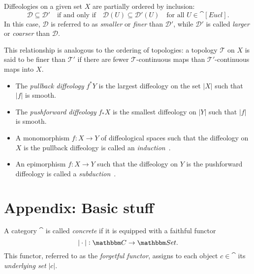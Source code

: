 \documentclass[a4paper,11pt]{article}  %
\newcommand{\Eucl}{\cat[Eucl]}
\begin{document}
\begin{remark}%
Diffeologies on a given set $X$ are partially ordered by inclusion:
$$
\mathcal{D} \subseteq \mathcal{D}' \quad \text{if and only if} \quad \mathcal{D}(U) \subseteq \mathcal{D}'(U) \quad \text{for all } U \in \Eucl.
$$
In this case, \(\mathcal{D}\) is referred to as \emph{smaller} or \emph{finer} than \(\mathcal{D}'\), while \(\mathcal{D}'\) is called \emph{larger} or \emph{coarser} than \(\mathcal{D}\).

This relationship is analogous to the ordering of topologies: a topology \(\mathcal{T}\) on \(X\) is said to be finer than \(\mathcal{T}'\) if there are fewer \(\mathcal{T}\)-continuous maps than \(\mathcal{T}'\)-continuous maps into \(X\).

\end{remark}
\begin{proposition}
\begin{itemize}
    \item The \emph{pullback diffeology} \(f^*Y\) is the largest diffeology on the set \(|X|\) such that \(|f|\) is smooth.
    \item The \emph{pushforward diffeology} \(f_*X\) is the smallest diffeology on \(|Y|\) such that \(|f|\) is smooth.
\end{itemize}
\end{proposition}

\begin{definition}
	\begin{itemize}
		\item A monomorphism \(f : X \to Y\) of diffeological spaces such that the diffeology on \(X\) is the pullback diffeology is called an \emph{induction}~\cite[Sec. 1.29]{IZ13}. 
		\item An epimorphism \(f : X \to Y\) such that the diffeology on \(Y\) is the pushforward diffeology is called a \emph{subduction}~\cite[Sec. 1.46]{IZ13}.

	\end{itemize}
\end{definition}



\appendix
\section*{Appendix: Basic stuff}
%
\begin{definition}\label{def:concrete_cat}
A category $\cat$ is called \emph{concrete} if it is equipped with a faithful functor 
$$
|\cdot| : \cat \to \Set.
$$
This functor, referred to as the \emph{forgetful functor}, assigns to each object $c \in \cat$ its \emph{underlying set} \(|c|\).
\end{definition}
\end{document}
